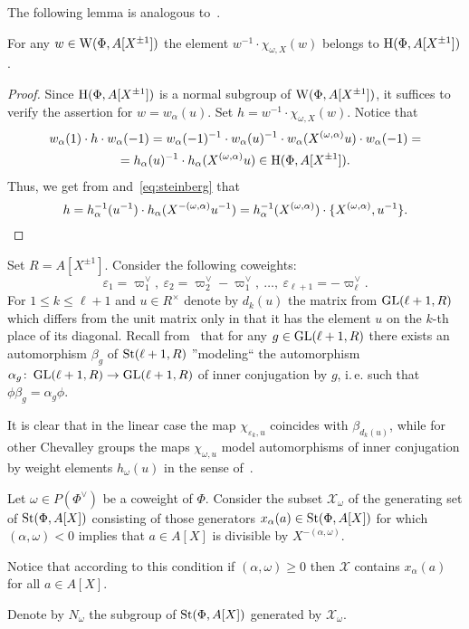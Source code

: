 The following lemma is analogous to~\cite[Lemma~3.1(c)]{Tu83}.
\begin{lemma} \label{lem:winv-chiw}
For any $w \in \operatorname{W}(\Phi, A[X^{\pm 1}])$ the element $w^{-1} \cdot \chi_{\omega, X}(w)$ belongs to $\operatorname{H}(\Phi, A[X^{\pm 1}])$.
\end{lemma}
\begin{proof}
Since $\operatorname{H}(\Phi, A[X^{\pm 1}])$ is a normal subgroup of $\operatorname{W}(\Phi, A[X^{\pm 1}])$, it suffices to verify the assertion for $w = w_\alpha(u)$.
Set $h = w^{-1} \cdot \chi_{\omega, X}(w)$.
Notice that
\begin{multline*} w_\alpha(1) \cdot h\cdot  w_\alpha(-1) = w_\alpha(-1)^{-1} \cdot w_\alpha(u)^{-1} \cdot w_{\alpha}(X^{(\omega, \alpha)} u) \cdot w_\alpha(-1) = \\
= h_\alpha(u)^{-1} \cdot h_\alpha(X^{(\omega, \alpha)}u) \in \operatorname{H}(\Phi, A[X^{\pm 1}]).\end{multline*}
Thus, we get from\cite[Lemme~5.2(b,g)]{Ma69} and~\eqref{eq:steinberg} that \[h = h_{\alpha}^{-1}(u^{-1}) \cdot h_{\alpha}(X^{-(\omega, \alpha)}u^{-1}) = h_{\alpha}^{-1}(X^{(\omega, \alpha)}) \cdot \{ X^{(\omega, \alpha)}, u^{-1} \}. \qedhere\]
\end{proof}

\begin{example} \label{exm:chi-linear}
Set $R = A[X^{\pm 1}]$.
Consider the following coweights:
\[\varepsilon_1 = \varpi_1^\vee,\ \varepsilon_2 = \varpi_2^\vee - \varpi_1^\vee,\ \ldots,\ \varepsilon_{\ell+1} = -\varpi^\vee_\ell.\]
For $1\leq k\leq \ell+1$ and $u \in R^\times$ denote by $d_k(u)$ the matrix from $\operatorname{GL}(\ell+1, R)$ which differs from the unit matrix only in that it has the element $u$ on the $k$-th place of its diagonal.
Recall from~\cite[Corollary~4]{Ka77} that for any $g \in \operatorname{GL}(\ell+1, R)$ there exists an automorphism $\beta_g$ of $\operatorname{St}(\ell+1, R)$ ''modeling`` the automorphism $\alpha_g \colon \operatorname{GL}(\ell+1, R) \to \operatorname{GL}(\ell+1, R)$ of inner conjugation by $g$, i.\,e. such that $\phi \beta_g = \alpha_g \phi$.


It is clear that in the linear case the map $\chi_{\varepsilon_k, u}$ coincides with $\beta_{d_k(u)}$,
 while for other Chevalley groups the maps $\chi_{\omega, u}$ model automorphisms of inner conjugation by weight elements $h_\omega(u)$ in the sense of~\cite[\S~4]{Vav09}.
\end{example}


Let $\omega \in P(\Phi^\vee)$ be a coweight of $\Phi$.
Consider the subset $\mathcal{X}_\omega$ of the generating set of $\operatorname{St}(\Phi, A[X])$ consisting of those generators $x_{\alpha}(a) \in \operatorname{St}(\Phi, A[X])$ for which
$(\alpha, \omega) < 0$ implies that $a \in A[X]$ is divisible by $X^{-(\alpha, \omega)}$.
\begin{rem}
Notice that according to this condition if $(\alpha, \omega) \geq 0$ then $\mathcal{X}$ contains $x_\alpha(a)$ for all $a \in A[X]$.
\end{rem}
Denote by $N_\omega$ the subgroup of $\operatorname{St}(\Phi, A[X])$ generated by $\mathcal{X}_\omega$.


